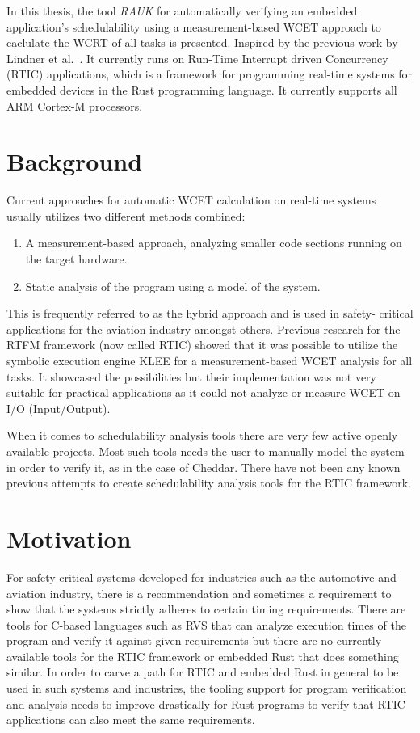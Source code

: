 In this thesis, the tool \emph{RAUK} for automatically verifying an embedded
application's schedulability using a measurement-based WCET approach to
caclulate the WCRT of all tasks is presented. Inspired by the previous work by
Lindner et al.\ \cite{lindner}. It currently runs on Run-Time Interrupt driven
Concurrency (RTIC) applications, which is a framework for programming real-time
systems for embedded devices in the Rust programming language. It currently
supports all ARM Cortex-M processors.

\section{Background}
Current approaches for automatic WCET calculation on real-time systems usually
utilizes two different methods combined:
\begin{enumerate}
    \item A measurement-based approach, analyzing smaller code sections running
        on the target hardware.
    \item Static analysis of the program using a model of the system.
\end{enumerate}
This is frequently referred to as the hybrid approach and is used in safety-
critical applications for the aviation industry\cite{rapita} amongst others.
Previous research for the RTFM framework (now called RTIC) showed that it was
possible to utilize the symbolic execution engine KLEE for a measurement-based
WCET analysis for all tasks\cite{lindner}. It showcased the possibilities but
their implementation was not very suitable for practical applications as it
could not analyze or measure WCET on I/O (Input/Output).

When it comes to schedulability analysis tools there are very few active openly
available projects. Most such tools needs the user to manually model the system
in order to verify it, as in the case of Cheddar\cite{cheddar}. There have not
been any known previous attempts to create schedulability analysis tools for
the RTIC framework.

\section{Motivation}
For safety-critical systems developed for industries such as the automotive and
aviation industry, there is a recommendation and sometimes a requirement to
show that the systems strictly adheres to certain timing requirements. There
are tools for C-based languages such as RVS\cite{rapita} that can analyze
execution times of the program and verify it against given requirements but
there are no currently available tools for the RTIC framework or embedded Rust
that does something similar. In order to carve a path for RTIC and embedded
Rust in general to be used in such systems and industries, the tooling support
for program verification and analysis needs to improve drastically for Rust
programs to verify that RTIC applications can also meet the same requirements.

